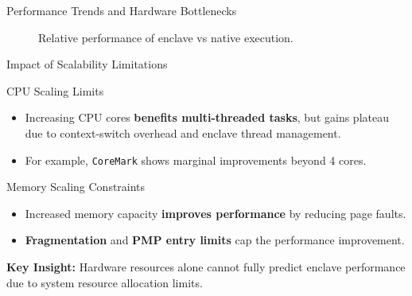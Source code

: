 \documentclass[aspectratio=169]{beamer}
\begin{document}
\begin{frame}{Performance Trends and Hardware Bottlenecks}
\centering
\begin{figure}[htbp]
\centering
{}
\caption{Relative performance of enclave vs native execution.}
\end{figure}
\end{frame}

\begin{frame}{Impact of Scalability Limitations}
\small
\begin{block}{CPU Scaling Limits}
\begin{itemize}
    \item Increasing CPU cores \textbf{benefits multi-threaded tasks}, but gains plateau due to context-switch overhead and enclave thread management.
    \item For example, \texttt{CoreMark} shows marginal improvements beyond 4 cores.
\end{itemize}
\end{block}

\begin{block}{Memory Scaling Constraints}
\begin{itemize}
    \item Increased memory capacity \textbf{improves performance} by reducing page faults.
    \item \textbf{Fragmentation} and \textbf{PMP entry limits} cap the performance improvement.
\end{itemize}
\end{block}

\centering
\textbf{Key Insight:} Hardware resources alone cannot fully predict enclave performance due to system resource allocation limits.
\end{frame}
\end{document}
